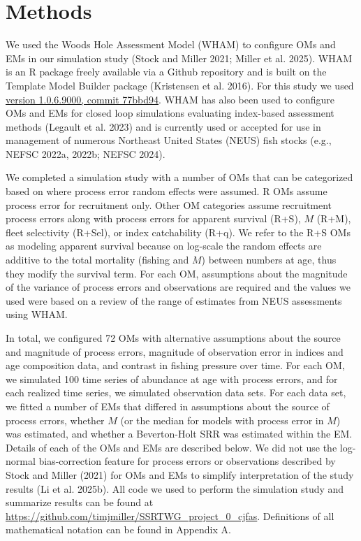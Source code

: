 \documentclass[
  12pt,
]{article}
\begin{document}
\section*{Methods}\label{methods}

We used the Woods Hole Assessment Model (WHAM) to configure OMs and EMs
in our simulation study (Stock and Miller 2021; Miller et al. 2025).
WHAM is an R package freely available via a Github repository and is
built on the Template Model Builder package (Kristensen et al. 2016).
For this study we used
\href{https://github.com/timjmiller/wham/tree/77bbd946e4881216a439933473d1c58b21c270c3}{version
1.0.6.9000, commit 77bbd94}. WHAM has also been used to configure OMs
and EMs for closed loop simulations evaluating index-based assessment
methods (Legault et al. 2023) and is currently used or accepted for use
in management of numerous Northeast United States (NEUS) fish stocks
(e.g., NEFSC 2022a, 2022b; NEFSC 2024).

We completed a simulation study with a number of OMs that can be
categorized based on where process error random effects were assumed. R
OMs assume process error for recruitment only. Other OM categories
assume recruitment process errors along with process errors for apparent
survival (R+S), \(M\) (R+M), fleet selectivity (R+Sel), or index
catchability (R+q). We refer to the R+S OMs as modeling apparent
survival because on log-scale the random effects are additive to the
total mortality (fishing and \(M\)) between numbers at age, thus they
modify the survival term. For each OM, assumptions about the magnitude
of the variance of process errors and observations are required and the
values we used were based on a review of the range of estimates from
NEUS assessments using WHAM.

In total, we configured 72 OMs with alternative assumptions about the
source and magnitude of process errors, magnitude of observation error
in indices and age composition data, and contrast in fishing pressure
over time. For each OM, we simulated 100 time series of abundance at age
with process errors, and for each realized time series, we simulated
observation data sets. For each data set, we fitted a number of EMs that
differed in assumptions about the source of process errors, whether
\(M\) (or the median for models with process error in \(M\)) was
estimated, and whether a Beverton-Holt SRR was estimated within the EM.
Details of each of the OMs and EMs are described below. We did not use
the log-normal bias-correction feature for process errors or
observations described by Stock and Miller (2021) for OMs and EMs to
simplify interpretation of the study results (Li et al. 2025b). All code
we used to perform the simulation study and summarize results can be
found at \url{https://github.com/timjmiller/SSRTWG_project_0_cjfas}.
Definitions of all mathematical notation can be found in Appendix A.
\end{document}
